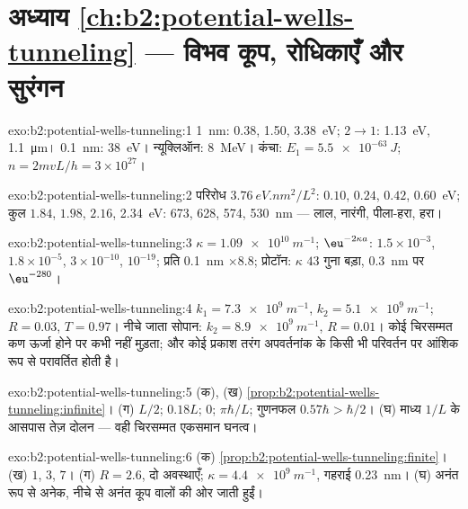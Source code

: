 \section*{अध्याय \ref{ch:b2:potential-wells-tunneling} --- विभव कूप, रोधिकाएँ और सुरंगन}

\begin{solution}{exo:b2:potential-wells-tunneling:1}
\qty{1}{nm}: \qty{0.38}{}, \qty{1.50}{}, \qty{3.38}{eV}; $2 \to 1$: \qty{1.13}{eV}, \qty{1.1}{\micro m}।
\qty{0.1}{nm}: \qty{38}{eV}। न्यूक्लिऑन: \qty{8}{MeV}। कंचा: $E_1 = \qty{5.5e-63}{J}$;
$n = 2mvL/h = 3 \times 10^{27}$।
\end{solution}

\begin{solution}{exo:b2:potential-wells-tunneling:2}
परिरोध $\qty{3.76}{eV.nm^2}/L^2$: $0.10$, $0.24$, $0.42$, \qty{0.60}{eV}; कुल
$1.84$, $1.98$, $2.16$, \qty{2.34}{eV}: \qty{673}{}, \qty{628}{}, \qty{574}{}, \qty{530}{nm} ---
लाल, नारंगी, पीला-हरा, हरा।
\end{solution}

\begin{solution}{exo:b2:potential-wells-tunneling:3}
$\kappa = \qty{1.09e10}{m^{-1}}$; $\eu^{-2\kappa a}$: $1.5 \times 10^{-3}$, $1.8 \times 10^{-5}$,
$3 \times 10^{-10}$, $10^{-19}$; प्रति \qty{0.1}{nm} $\times 8.8$; प्रोटॉन: $\kappa$
$43$ गुना बड़ा, \qty{0.3}{nm} पर $\eu^{-280}$।
\end{solution}

\begin{solution}{exo:b2:potential-wells-tunneling:4}
$k_1 = \qty{7.3e9}{m^{-1}}$, $k_2 = \qty{5.1e9}{m^{-1}}$; $R = 0.03$, $T = 0.97$। नीचे
जाता सोपान: $k_2 = \qty{8.9e9}{m^{-1}}$, $R = 0.01$। कोई चिरसम्मत कण ऊर्जा होने पर
कभी नहीं मुड़ता; और कोई प्रकाश तरंग अपवर्तनांक के किसी भी परिवर्तन पर
आंशिक रूप से परावर्तित होती है।
\end{solution}

\begin{solution}{exo:b2:potential-wells-tunneling:5}
(क), (ख) \cref{prop:b2:potential-wells-tunneling:infinite}। (ग) $L/2$;
$0.18L$; $0$; $\pi\hbar/L$; गुणनफल $0.57\hbar > \hbar/2$। (घ) माध्य $1/L$ के
आसपास तेज़ दोलन --- वही चिरसम्मत एकसमान घनत्व।
\end{solution}

\begin{solution}{exo:b2:potential-wells-tunneling:6}
(क) \cref{prop:b2:potential-wells-tunneling:finite}। (ख) $1$, $3$, $7$।
(ग) $R = 2.6$, दो अवस्थाएँ; $\kappa = \qty{4.4e9}{m^{-1}}$, गहराई \qty{0.23}{nm}। (घ)
अनंत रूप से अनेक, नीचे से अनंत कूप वालों की ओर जाती हुईं।
\end{solution}

